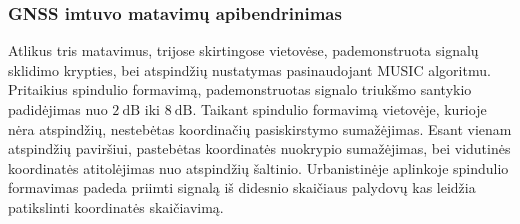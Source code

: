 \documentclass[main.tex]{subfiles}
\begin{document}
\subsubsection{GNSS imtuvo matavimų apibendrinimas}


Atlikus tris matavimus, trijose skirtingose vietovėse, pademonstruota signalų
sklidimo kryp\-ties, bei atspindžių nustatymas pasinaudojant MUSIC algoritmu.
Pritaikius spindulio formavimą, pademonstruotas signalo triukšmo santykio padidėjimas nuo
$2\ \mathrm{dB}$ iki $8\ \mathrm{dB}$. Taikant spindulio formavimą
vietovėje, kurioje nėra atspindžių, nestebėtas koordinačių pasiskirstymo
sumažėjimas. Esant vienam atspindžių paviršiui, pastebėtas koordinatės 
nuokrypio sumažėjimas, bei vidutinės koordinatės atitolėjimas nuo atspindžių
šaltinio. Urbanistinėje aplinkoje spindulio formavimas padeda priimti
signalą iš didesnio skaičiaus palydovų kas leidžia patikslinti
koordinatės skai\-čia\-vi\-mą.
\end{document}
